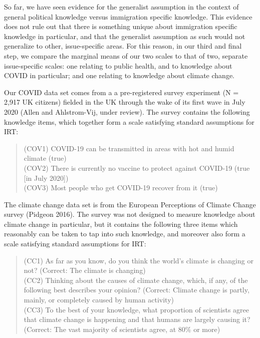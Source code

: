 \documentclass[11pt,halfline,a4paper,]{ouparticle}
\begin{document}
So far, we have seen evidence for the generalist assumption in the
context of general political knowledge versus immigration specific
knowledge. This evidence does not rule out that there is something
unique about immigration specific knowledge in particular, and that the
generalist assumption as such would not generalize to other,
issue-specific areas. For this reason, in our third and final step, we
compare the marginal means of our two scales to that of two, separate
issue-specific scales: one relating to public health, and to knowledge
about COVID in particular; and one relating to knowledge about climate
change.

Our COVID data set comes from a a pre-registered survey experiment (N =
2,917 UK citizens) fielded in the UK through the wake of its first wave
in July 2020 (Allen and Ahlstrom-Vij, under review). The survey contains
the following knowledge items, which together form a scale satisfying
standard assumptions for IRT:

\begin{quote}
(COV1) COVID-19 can be transmitted in areas with hot and humid climate
(true)\\
(COV2) There is currently no vaccine to protect against COVID-19 (true
{[}in July 2020{]})\\
(COV3) Most people who get COVID-19 recover from it (true)
\end{quote}

The climate change data set is from the European Perceptions of Climate
Change survey (Pidgeon 2016). The survey was not designed to measure
knowledge about climate change in particular, but it contains the
following three items which reasonably can be taken to tap into such
knowledge, and moreover also form a scale satisfying standard
assumptions for IRT:

\begin{quote}
(CC1) As far as you know, do you think the world's climate is changing
or not? (Correct: The climate is changing)\\
(CC2) Thinking about the causes of climate change, which, if any, of the
following best describes your opinion? (Correct: Climate change is
partly, mainly, or completely caused by human activity)\\
(CC3) To the best of your knowledge, what proportion of scientists agree
that climate change is happening and that humans are largely causing it?
(Correct: The vast majority of scientists agree, at 80\% or more)
\end{quote}
\end{document}
